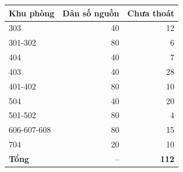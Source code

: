 \small\begin{tabular}{lrr}
\toprule
Khu phòng & Dân số nguồn & Chưa thoát\\\midrule
303 & 40 & 12\\
301-302 & 80 & 6\\
404 & 40 & 7\\
403 & 40 & 28\\
401-402 & 80 & 10\\
504 & 40 & 20\\
501-502 & 80 & 4\\
606-607-608 & 80 & 15\\
704 & 20 & 10\\
\textbf{Tổng} & -- & \textbf{112}\\
\bottomrule\end{tabular}
